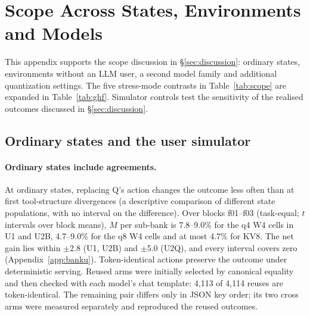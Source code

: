 \section{Scope Across States, Environments and Models}
\label{app:scope}

This appendix supports the scope discussion in \S\ref{sec:discussion}: ordinary states, environments without an LLM user, a second model family and additional quantization settings. The five stress-mode contrasts in Table~\ref{tab:scope} are expanded in Table~\ref{tab:ghf}. Simulator controls test the sensitivity of the realised outcomes discussed in \S\ref{sec:discussion}.



\subsection{Ordinary states and the user simulator}
\label{app:ordinary}

\paragraph{Ordinary states include agreements.} At ordinary states, replacing Q's action changes the outcome less often than at first tool-structure divergences (a descriptive comparison of different state populations, with no interval on the difference). Over blocks f01--f03 (task-equal; $t$ intervals over block means), $M$ per sub-bank is 7.8--9.0\% for the q4 W4 cells in U1 and U2B, 4.7--9.0\% for the q8 W4 cells and at most 4.7\% for KV8. The net gain lies within $\pm$2.8\pp{} (U1, U2B) and $\pm$5.0\pp{} (U2Q), and every interval covers zero (Appendix~\ref{app:banku}). %
Token-identical actions preserve the outcome under deterministic serving. Reused arms were initially selected by canonical equality and then checked with each model's chat template: 4{,}113 of 4{,}114 reuses are token-identical. The remaining pair differs only in JSON key order; its two cross arms were measured separately and reproduced the reused outcomes. %
